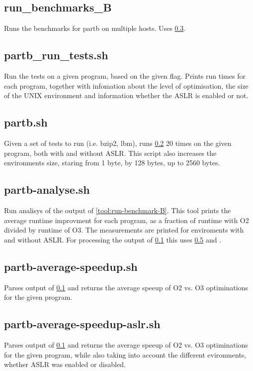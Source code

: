 \documentclass{article}
\begin{document}
\subsection{run\_benchmarks\_B} \label{tool:run-benchmarks-B}
Runs the benchmarks for partb on multiple hosts. Uses \ref{tool:partb.sh}.

\subsection{partb\_run\_tests.sh} \label{tool:partb-run-tests.sh}
Run the tests on a given program, based on the given flag. Prints run times for each program, together with infomation about the level of optimisation, the size of the UNIX environment and information whether the ASLR is enabled or not.

\subsection{partb.sh} \label{tool:partb.sh}
Given a set of tests to run (i.e. bzip2, lbm), runs \ref{tool:partb-run-tests.sh} 20 times on the given program, both with and without ASLR. This script also increases the environments size, staring from 1 byte, by 128 bytes, up to 2560 bytes.


\subsection{partb-analyse.sh}
Run analisys of the output of \ref{tool:run-benchmark-B}. This tool prints the average runtime improvment for each program, as a fraction of runtime with O2 divided by runtime of O3. The measurements are printed for enviroments with and without ASLR. For processing the output of \ref{tool:run-benchmarks-B} this uses \ref{tool:partb-average-speedup.sh} and \label{tool:partb-average-speedup-aslr.sh}.

\subsection{partb-average-speedup.sh} \label{tool:partb-average-speedup.sh}
Parses output of \ref{tool:run-benchmarks-B} and returns the average speeup of O2 vs. O3 optiminations for the given program.

\subsection{partb-average-speedup-aslr.sh} \label{tool:partb-average-speedup-aslr.sh}
Parses output of \ref{tool:run-benchmarks-B} and returns the average speeup of O2 vs. O3 optiminations for the given program, while also taking into account the different evironments, whether ASLR was enabled or disabled.
\end{document}
